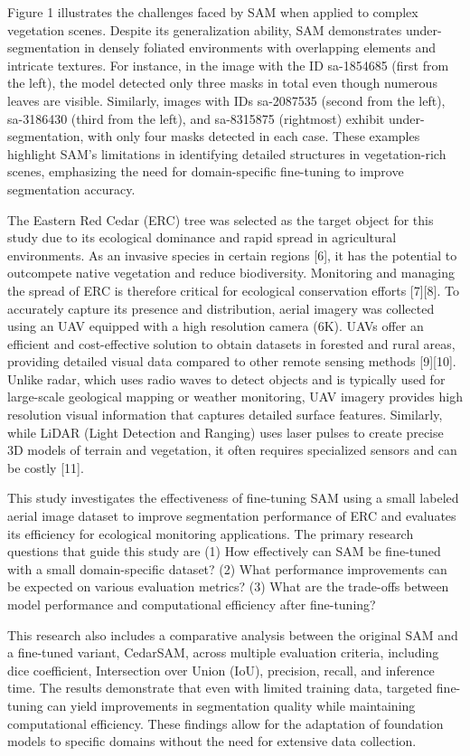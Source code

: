 \documentclass[letterpaper, 10 pt, conference]{ieeeconf}  %
\begin{document}
Figure 1 illustrates the challenges faced by SAM when applied to complex vegetation scenes. Despite its generalization ability, SAM demonstrates under-segmentation in densely foliated environments with overlapping elements and intricate textures. For instance, in the image with the ID sa-1854685 (first from the left), the model detected only three masks in total even though numerous leaves are visible. Similarly, images with IDs sa-2087535 (second from the left), sa-3186430 (third from the left), and sa-8315875 (rightmost) exhibit under-segmentation, with only four masks detected in each case. These examples highlight SAM's limitations in identifying detailed structures in vegetation-rich scenes, emphasizing the need for domain-specific fine-tuning to improve segmentation accuracy.

The Eastern Red Cedar (ERC) tree was selected as the target object for this study due to its ecological dominance and rapid spread in agricultural environments. As an invasive species in certain regions [6], it has the potential to outcompete native vegetation and reduce biodiversity. Monitoring and managing the spread of ERC is therefore critical for ecological conservation efforts [7][8]. To accurately capture its presence and distribution, aerial imagery was collected using an UAV equipped with a high resolution camera (6K). UAVs offer an efficient and cost-effective solution to obtain datasets in forested and rural areas, providing detailed visual data compared to other remote sensing methods [9][10]. Unlike radar, which uses radio waves to detect objects and is typically used for large-scale geological mapping or weather monitoring, UAV imagery provides high resolution visual information that captures detailed surface features. Similarly, while LiDAR (Light Detection and Ranging) uses laser pulses to create precise 3D models of terrain and vegetation, it often requires specialized sensors and can be costly [11].

This study investigates the effectiveness of fine-tuning SAM using a small labeled aerial image dataset to improve segmentation performance of ERC and evaluates its efficiency for ecological monitoring applications. The primary research questions that guide this study are (1) How effectively can SAM be fine-tuned with a small domain-specific dataset? (2) What performance improvements can be expected on various evaluation metrics? (3) What are the trade-offs between model performance and computational efficiency after fine-tuning?

This research also includes a comparative analysis between the original SAM and a fine-tuned variant, CedarSAM, across multiple evaluation criteria, including dice coefficient, Intersection over Union (IoU), precision, recall, and inference time. The results demonstrate that even with limited training data, targeted fine-tuning can yield improvements in segmentation quality while maintaining computational efficiency. These findings allow for the adaptation of foundation models to specific domains without the need for extensive data collection.
\end{document}

